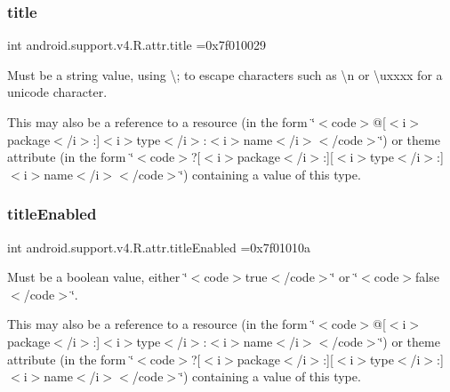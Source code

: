 \subsubsection{\texorpdfstring{title}{title}}
{\footnotesize\ttfamily int android.\+support.\+v4.\+R.\+attr.\+title =0x7f010029\hspace{0.3cm}{\ttfamily [static]}}

Must be a string value, using \textquotesingle{}\textbackslash{};\textquotesingle{} to escape characters such as \textquotesingle{}\textbackslash{}n\textquotesingle{} or \textquotesingle{}\textbackslash{}uxxxx\textquotesingle{} for a unicode character. 

This may also be a reference to a resource (in the form \char`\"{}$<$code$>$@\mbox{[}$<$i$>$package$<$/i$>$\+:\mbox{]}$<$i$>$type$<$/i$>$\+:$<$i$>$name$<$/i$>$$<$/code$>$\char`\"{}) or theme attribute (in the form \char`\"{}$<$code$>$?\mbox{[}$<$i$>$package$<$/i$>$\+:\mbox{]}\mbox{[}$<$i$>$type$<$/i$>$\+:\mbox{]}$<$i$>$name$<$/i$>$$<$/code$>$\char`\"{}) containing a value of this type. \mbox{\label{classandroid_1_1support_1_1v4_1_1R_1_1attr_aa20397e6dba2afdfdd19964ccafba0f7}} 
\subsubsection{\texorpdfstring{title\+Enabled}{titleEnabled}}
{\footnotesize\ttfamily int android.\+support.\+v4.\+R.\+attr.\+title\+Enabled =0x7f01010a\hspace{0.3cm}{\ttfamily [static]}}

Must be a boolean value, either \char`\"{}$<$code$>$true$<$/code$>$\char`\"{} or \char`\"{}$<$code$>$false$<$/code$>$\char`\"{}. 

This may also be a reference to a resource (in the form \char`\"{}$<$code$>$@\mbox{[}$<$i$>$package$<$/i$>$\+:\mbox{]}$<$i$>$type$<$/i$>$\+:$<$i$>$name$<$/i$>$$<$/code$>$\char`\"{}) or theme attribute (in the form \char`\"{}$<$code$>$?\mbox{[}$<$i$>$package$<$/i$>$\+:\mbox{]}\mbox{[}$<$i$>$type$<$/i$>$\+:\mbox{]}$<$i$>$name$<$/i$>$$<$/code$>$\char`\"{}) containing a value of this type. \mbox{\label{classandroid_1_1support_1_1v4_1_1R_1_1attr_a208e8872b98d2610ddc09d40cd6b4390}} 
